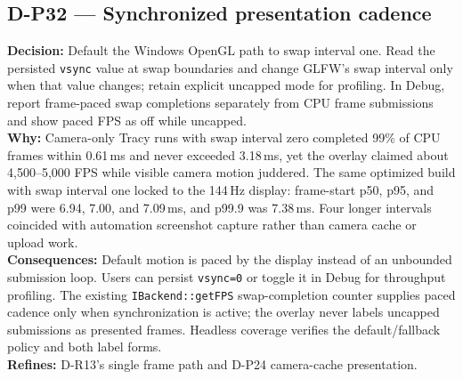 \subsection*{D-P32 --- Synchronized presentation cadence}
\begin{decisionbox}[title={D-P32 \quad 2026-08-16}]
\textbf{Decision:} Default the Windows OpenGL path to swap interval one. Read
the persisted \texttt{vsync} value at swap boundaries and change GLFW's swap
interval only when that value changes; retain explicit uncapped mode for
profiling. In Debug, report frame-paced swap completions separately from CPU
frame submissions and show paced FPS as off while uncapped.\\
\textbf{Why:} Camera-only Tracy runs with swap interval zero completed 99\% of
CPU frames within 0.61\,ms and never exceeded 3.18\,ms, yet the overlay claimed
about 4,500--5,000 FPS while visible camera motion juddered. The same optimized
build with swap interval one locked to the 144\,Hz display: frame-start p50,
p95, and p99 were 6.94, 7.00, and 7.09\,ms, and p99.9 was 7.38\,ms. Four longer
intervals coincided with automation screenshot capture rather than camera
cache or upload work.\\
\textbf{Consequences:} Default motion is paced by the display instead of an
unbounded submission loop. Users can persist \texttt{vsync=0} or toggle it in
Debug for throughput profiling. The existing \texttt{IBackend::getFPS}
swap-completion counter supplies paced cadence only when synchronization is
active; the overlay never labels uncapped submissions as presented frames.
Headless coverage verifies the default/fallback policy and both label forms.\\
\textbf{Refines:} D-R13's single frame path and D-P24 camera-cache presentation.
\end{decisionbox}

